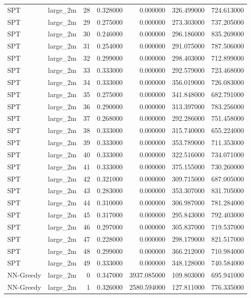 \begin{tabular}{llrrrrr}
SPT & large_2m & 28 & 0.328000 & 0.000000 & 326.499000 & 724.613000 \\
SPT & large_2m & 29 & 0.275000 & 0.000000 & 273.303000 & 737.205000 \\
SPT & large_2m & 30 & 0.246000 & 0.000000 & 296.186000 & 835.269000 \\
SPT & large_2m & 31 & 0.254000 & 0.000000 & 291.075000 & 787.506000 \\
SPT & large_2m & 32 & 0.299000 & 0.000000 & 298.403000 & 712.899000 \\
SPT & large_2m & 33 & 0.333000 & 0.000000 & 292.579000 & 723.468000 \\
SPT & large_2m & 34 & 0.333000 & 0.000000 & 356.019000 & 726.083000 \\
SPT & large_2m & 35 & 0.275000 & 0.000000 & 341.848000 & 682.791000 \\
SPT & large_2m & 36 & 0.290000 & 0.000000 & 313.397000 & 783.256000 \\
SPT & large_2m & 37 & 0.268000 & 0.000000 & 292.286000 & 751.458000 \\
SPT & large_2m & 38 & 0.333000 & 0.000000 & 315.740000 & 655.224000 \\
SPT & large_2m & 39 & 0.333000 & 0.000000 & 353.789000 & 711.353000 \\
SPT & large_2m & 40 & 0.333000 & 0.000000 & 322.516000 & 734.071000 \\
SPT & large_2m & 41 & 0.333000 & 0.000000 & 375.155000 & 730.260000 \\
SPT & large_2m & 42 & 0.321000 & 0.000000 & 309.715000 & 687.005000 \\
SPT & large_2m & 43 & 0.283000 & 0.000000 & 353.307000 & 831.705000 \\
SPT & large_2m & 44 & 0.310000 & 0.000000 & 306.987000 & 781.284000 \\
SPT & large_2m & 45 & 0.317000 & 0.000000 & 295.843000 & 792.403000 \\
SPT & large_2m & 46 & 0.297000 & 0.000000 & 305.837000 & 719.537000 \\
SPT & large_2m & 47 & 0.228000 & 0.000000 & 298.179000 & 821.517000 \\
SPT & large_2m & 48 & 0.299000 & 0.000000 & 366.212000 & 710.984000 \\
SPT & large_2m & 49 & 0.333000 & 0.000000 & 348.128000 & 740.584000 \\
NN-Greedy & large_2m & 0 & 0.347000 & 3937.085000 & 109.803000 & 695.941000 \\
NN-Greedy & large_2m & 1 & 0.326000 & 2580.594000 & 127.811000 & 776.335000 \\

\end{tabular}
